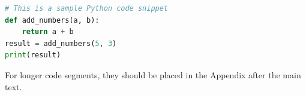 \documentclass[12pt]{article}
\begin{document}
\newpage 


\begin{center}
\begin{lstlisting}[language=Python]
# This is a sample Python code snippet
def add_numbers(a, b):
    return a + b
result = add_numbers(5, 3)
print(result)
\end{lstlisting}
\end{center}

For longer code segments, they should be placed in the Appendix after the main text.

\end{document}
